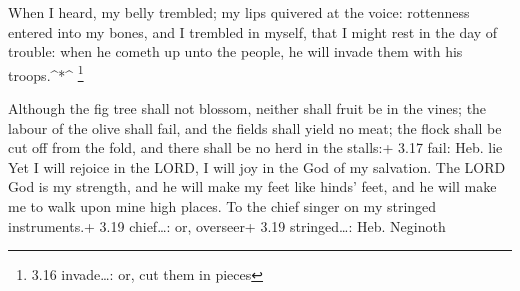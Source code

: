  When I heard, my belly trembled; my lips quivered at the
voice: rottenness entered into my bones, and I trembled in myself, that
I might rest in the day of trouble: when he cometh up unto the people,
he will invade them with his troops.\^{}*\^{} \footnote{3.16
  invade\ldots: or, cut them in pieces}

 Although the fig tree shall not blossom, neither shall
fruit be in the vines; the labour of the olive shall fail, and the
fields shall yield no meat; the flock shall be cut off from the fold,
and there shall be no herd in the stalls:+ 3.17 fail: Heb. lie
 Yet I will rejoice in the LORD, I will joy in the God of
my salvation.  The LORD God is my strength, and he will
make my feet like hinds' feet, and he will make me to walk upon mine
high places. To the chief singer on my stringed instruments.+ 3.19
chief\ldots: or, overseer+ 3.19 stringed\ldots: Heb. Neginoth
